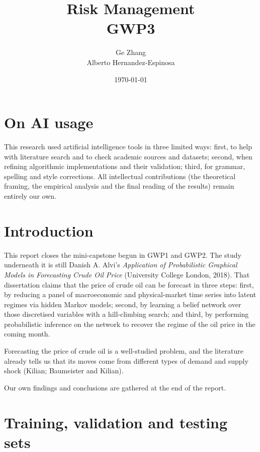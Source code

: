 \documentclass[11pt,a4paper]{article}
\title{Risk Management \\ GWP3\\[0.3em]}
\author{Ge Zhang \\ Alberto Hernandez-Espinosa}
\date{\today}
\begin{document}
\maketitle



\vspace{0.6em}

\section*{On AI usage}

This research used artificial intelligence tools in three limited ways: first, to help with
literature search and to check academic sources and datasets; second, when refining
algorithmic implementations and their validation; third, for grammar,
spelling and style corrections. All intellectual contributions (the
theoretical framing, the empirical analysis and the final reading of the results) remain entirely our own.


\section{Introduction}

This report closes the mini-capstone begun in GWP1 and GWP2. The study underneath it is still Danish A.
Alvi's \textit{Application of Probabilistic Graphical Models in
Forecasting Crude Oil Price} (University College London, 2018). That dissertation claims that the price
of crude oil can be forecast in three steps: first, by reducing a panel of macroeconomic and physical-market
time series into latent regimes via hidden Markov models; second, by learning a belief network over those
discretised variables with a hill-climbing search; and third, by performing probabilistic inference on
the network to recover the regime of the oil price in the coming month.

Forecasting the price of crude oil is a well-studied problem, and the literature already tells us
that its moves come from different types of demand and supply shock (Kilian; Baumeister and Kilian).

Our own findings and conclusions are gathered at the end of the report.

\section{Training, validation and testing sets}
\end{document}
